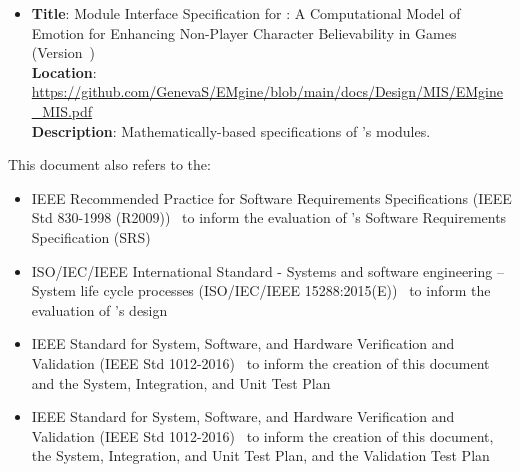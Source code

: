 \begin{itemize}
    \item \textbf{Title}: Module Interface Specification for \progname{}: A
    Computational Model of Emotion for Enhancing Non-Player Character
    Believability in Games (Version~\misversion) \\
    \textbf{Location}:
    \href{https://github.com/GenevaS/EMgine/blob/main/docs/Design/MIS/EMgine_MIS.pdf}{
        https://github.com/GenevaS/EMgine/blob/main/docs/Design/MIS/EMgine
       \newline \_MIS.pdf} \\
    \textbf{Description}: Mathematically-based specifications of \progname{}'s
    modules.

\end{itemize}

\clearpage
\noindent This document also refers to the:
\begin{itemize}

    \item IEEE Recommended Practice for Software Requirements Specifications
    (IEEE Std 830-1998 (R2009))~\citep{srsIEEE} to inform the evaluation of
    \progname{}'s Software Requirements Specification (SRS)

    \item ISO/IEC/IEEE International Standard - Systems and software
    engineering -- System life cycle processes (ISO/IEC/IEEE
    15288:2015(E))~\citep{slcIEEE} to inform the evaluation of \progname{}'s
    design

    \item IEEE Standard for System, Software, and Hardware Verification and
    Validation (IEEE Std 1012-2016)~\citep{vvIEEE} to inform the creation of
    this document and the System, Integration, and Unit Test Plan

    \item IEEE Standard for System, Software, and Hardware Verification and
    Validation (IEEE Std 1012-2016)~\citep{vvDocIEEE} to inform the creation of
    this document, the System, Integration, and Unit Test Plan, and the
    Validation Test Plan

\end{itemize}